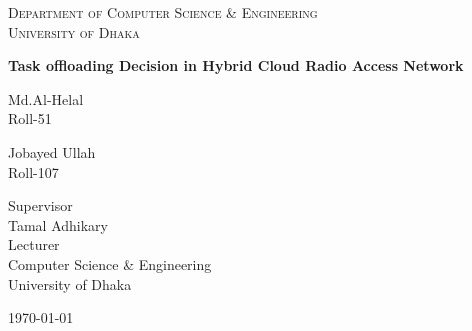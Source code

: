 \documentclass[a4paper,12pt]{article}
\begin{document}
\begin{titlepage}
\centering
{\scshape\LARGE Department of Computer Science \& Engineering\\\vspace{0.5cm}University of Dhaka \par}
\vspace{1.5cm}
{\huge\bfseries Task offloading Decision in Hybrid Cloud Radio Access Network\par}
\vspace{3cm}
\vspace{0.5cm}
{\Large \parbox{5cm}{\centering Md.Al-Helal\\Roll-51}\hspace{1cm}\parbox{6cm}{\centering Jobayed Ullah\\Roll-107}}
\vfill
{\Large Supervisor\\
\vspace{1cm}%
 Tamal Adhikary \\ Lecturer\\Computer Science \& Engineering\\University of Dhaka}
\vfill
{\large \today\par}
\end{titlepage}
\end{document}
